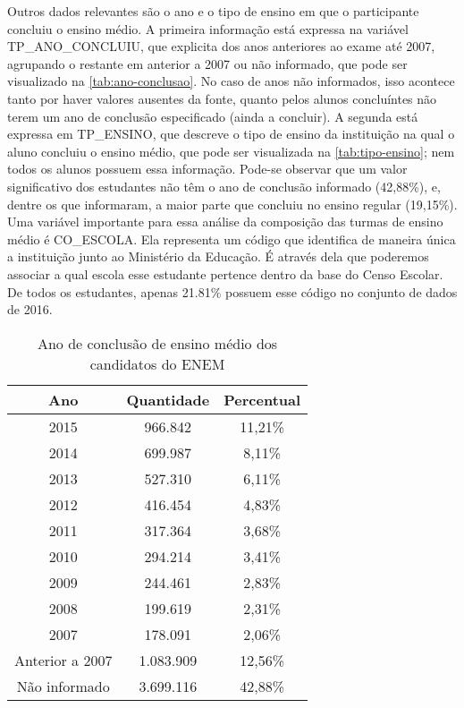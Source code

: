   Outros dados relevantes são o ano e o tipo de ensino em que o participante concluiu o ensino médio. A primeira informação está expressa na variável TP\_ANO\_CONCLUIU, que explicita dos anos anteriores ao exame até 2007, agrupando o restante em anterior a 2007 ou não informado, que pode ser visualizado na \autoref{tab:ano-conclusao}. No caso de anos não informados, isso acontece tanto por haver valores ausentes da fonte, quanto pelos alunos concluíntes não terem um ano de conclusão especificado (ainda a concluir). A segunda está expressa em TP\_ENSINO, que descreve o tipo de ensino da instituição na qual o aluno concluiu o ensino médio, que pode ser visualizada na \autoref{tab:tipo-ensino}; nem todos os alunos possuem essa informação. Pode-se observar que um valor significativo dos estudantes não têm o ano de conclusão informado (42,88\%), e, dentre os que informaram, a maior parte que concluiu no ensino regular (19,15\%). Uma variável importante para essa análise da composição das turmas de ensino médio é CO\_ESCOLA. Ela representa um código que identifica de maneira única a instituição junto ao Ministério da Educação. É através dela que poderemos associar a qual escola esse estudante pertence dentro da base do Censo Escolar. De todos os estudantes, apenas 21.81\% possuem esse código no conjunto de dados de 2016.

  \begin{table}[h]
    \begin{tabular}{ccc}
    \hline
    \multicolumn{1}{c}{\textbf{Ano}} & \textbf{Quantidade} & \textbf{Percentual} \\ \hline
    2015                             & 966.842              & 11,21\%             \\ \hline
    2014                             & 699.987              & 8,11\%              \\ \hline
    2013                             & 527.310              & 6,11\%              \\ \hline
    2012                             & 416.454              & 4,83\%              \\ \hline
    2011                             & 317.364              & 3,68\%              \\ \hline
    2010                             & 294.214              & 3,41\%              \\ \hline
    2009                             & 244.461              & 2,83\%              \\ \hline
    2008                             & 199.619              & 2,31\%              \\ \hline
    2007                             & 178.091              & 2,06\%              \\ \hline
    Anterior a 2007                  & 1.083.909             & 12,56\%             \\ \hline
    Não informado                    & 3.699.116             & 42,88\%             \\ \hline
    \end{tabular}
    \caption{Ano de conclusão de ensino médio dos candidatos do ENEM}
    \label{tab:ano-conclusao}
    \end{table}

